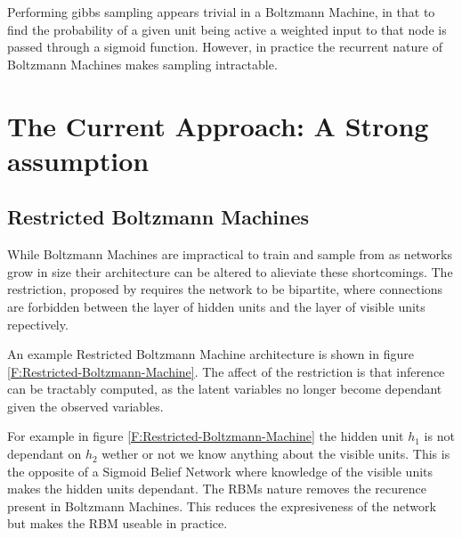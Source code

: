   Performing gibbs sampling appears trivial in a Boltzmann Machine, in that to find the probability of a given unit being active a weighted input to that node is passed through a sigmoid function. However, in practice the recurrent nature of Boltzmann Machines makes sampling intractable.



  \section{The Current Approach: A Strong assumption}

  \subsection{Restricted Boltzmann Machines}

  While Boltzmann Machines are impractical to train and sample from as networks grow in size  their architecture can be altered to alieviate these shortcomings. The restriction, proposed by  requires the network to be bipartite, where connections are forbidden between the layer of hidden units and the layer of visible units repectively.

  An example Restricted Boltzmann Machine architecture is shown in figure \ref{F:Restricted-Boltzmann-Machine}. The affect of the restriction is that inference can be tractably computed, as the latent variables no longer become dependant given the observed variables.

  For example in figure \ref{F:Restricted-Boltzmann-Machine} the hidden unit $h_1$ is not dependant on $h_2$ wether or not we know anything about the visible units. This is the opposite of a Sigmoid Belief Network where knowledge of the visible units makes the hidden units dependant. The RBMs nature removes the recurence present in Boltzmann Machines. This reduces the expresiveness of the network but makes the RBM useable in practice. 

